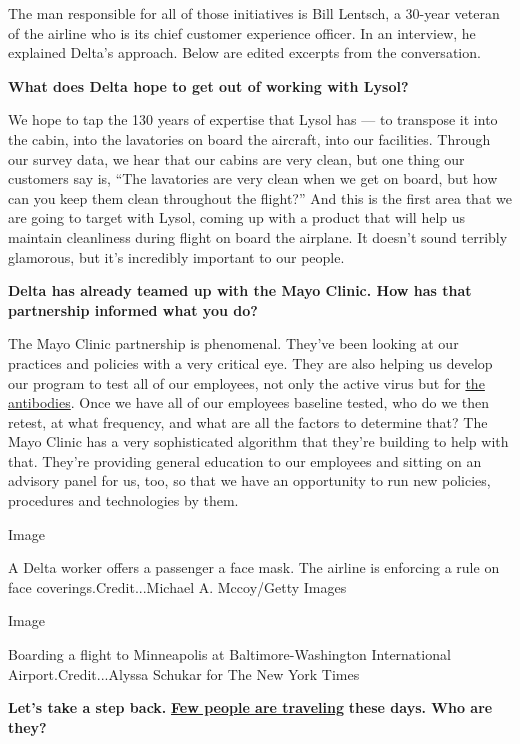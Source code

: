The man responsible for all of those initiatives is Bill Lentsch, a
30-year veteran of the airline who is its chief customer experience
officer. In an interview, he explained Delta's approach. Below are
edited excerpts from the conversation.

\textbf{What does Delta hope to get out of working with Lysol?}

We hope to tap the 130 years of expertise that Lysol has --- to
transpose it into the cabin, into the lavatories on board the aircraft,
into our facilities. Through our survey data, we hear that our cabins
are very clean, but one thing our customers say is, ``The lavatories are
very clean when we get on board, but how can you keep them clean
throughout the flight?'' And this is the first area that we are going to
target with Lysol, coming up with a product that will help us maintain
cleanliness during flight on board the airplane. It doesn't sound
terribly glamorous, but it's incredibly important to our people.

\textbf{Delta has already teamed up with the Mayo Clinic. How has that
partnership informed what you do?}

The Mayo Clinic partnership is phenomenal. They've been looking at our
practices and policies with a very critical eye. They are also helping
us develop our program to test all of our employees, not only the active
virus but for
\href{https://www.nytimes3xbfgragh.onion/2020/07/26/health/coronvirus-antibody-tests.html?action=click\&module=Top\%20Stories\&pgtype=Homepage}{the
antibodies}. Once we have all of our employees baseline tested, who do
we then retest, at what frequency, and what are all the factors to
determine that? The Mayo Clinic has a very sophisticated algorithm that
they're building to help with that. They're providing general education
to our employees and sitting on an advisory panel for us, too, so that
we have an opportunity to run new policies, procedures and technologies
by them.

Image

A Delta worker offers a passenger a face mask. The airline is enforcing
a rule on face coverings.Credit...Michael A. Mccoy/Getty Images

Image

Boarding a flight to Minneapolis at Baltimore-Washington International
Airport.Credit...Alyssa Schukar for The New York Times

\textbf{Let's take a step back.}
\textbf{\href{https://www.nytimes3xbfgragh.onion/2020/05/10/business/airlines-coronavirus-bleak-future.html}{Few
people are traveling}} \textbf{these days. Who are they?}

